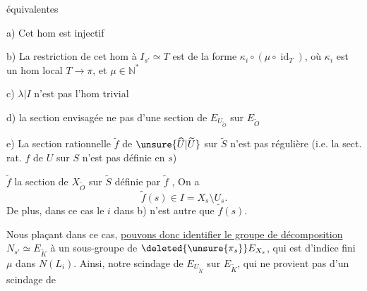 équivalentes

a) Cet hom est injectif

b) La restriction de cet hom à $I_{s'}\simeq T$ est de la forme $\kappa_i\circ(\mu\circ\operatorname{id}_T)$, où $\kappa_i$ est un hom local $T\longrightarrow\pi$, et $\mu\in\mathbb N^{*}$

c) $\lambda\vert I$ n'est pas l'hom trivial

d) la section envisagée  ne  pas d'une section de $E_{U_{\widetilde O}}$ sur $E_{\widetilde O}$

e) La section rationnelle  $\widetilde f$ de $\unsure{\widehat U|\widetilde U}$ sur $\widetilde S$ n'est pas régulière (i.e. la sect. rat. $f$ de $U$ sur $S$ n'est pas définie en $s$)

  $\widetilde f$  la section de $X_{\widetilde O}$ sur $\widetilde S$ définie par $\widetilde f$ ,  On a
\[
\widetilde f(s)\in I=X_s\setminus U_s.
\]
De plus, dans ce cas le $i$ dans b) n'est autre que $\widetilde f(s)$.

Nous plaçant dans ce cas, \uline{ pouvons donc identifier le groupe de décomposition} $N_{s'}\simeq E_{\widetilde K}$ à un sous-groupe de $\deleted{\unsure{\pi_s}}E_{X_s}$,  qui est d'indice fini $\mu$ dans  $N(L_i)$. Ainsi, notre scindage  de $E_{U_{\widetilde K}}$  sur $E_{\widetilde K}$, qui ne provient pas d'un scindage de
